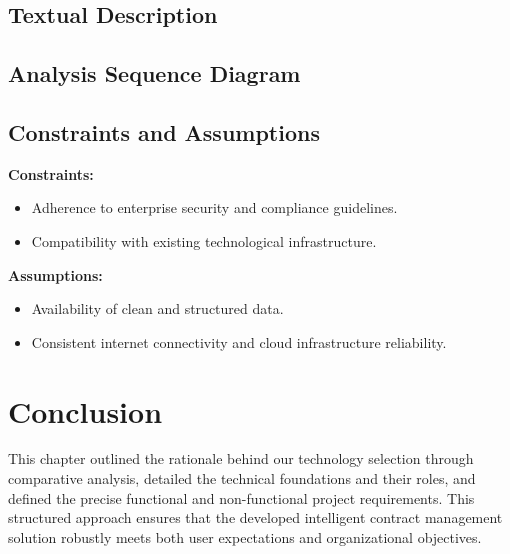 \subsection{Textual Description}

\subsection{Analysis Sequence Diagram}

\subsection{Constraints and Assumptions}
\textbf{Constraints:}
\begin{itemize}
    \item Adherence to enterprise security and compliance guidelines.
    \item Compatibility with existing technological infrastructure.
\end{itemize}

\textbf{Assumptions:}
\begin{itemize}
    \item Availability of clean and structured data.
    \item Consistent internet connectivity and cloud infrastructure reliability.
\end{itemize}

\section{Conclusion}
This chapter outlined the rationale behind our technology selection through comparative analysis, detailed the technical foundations and their roles, and defined the precise functional and non-functional project requirements. This structured approach ensures that the developed intelligent contract management solution robustly meets both user expectations and organizational objectives.